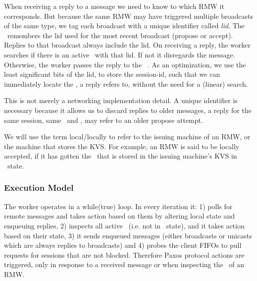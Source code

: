 \custvspace
{}
When receiving a reply to a message we need to know to which RMW it corresponds. But because the same RMW may have triggered multiple broadcasts of the same type, we tag each broadcast with a unique identifier called \emph{lid}. The \locentry~remembers the lid used for the most recent broadcast (propose or accept). 
Replies to that broadcast always include the lid. On receiving a reply, the worker searches if there is an active \locentry~with that lid. If not it disregards the message. Otherwise, the worker passes the reply to the \locentry~. As an optimization, we use the least significant bits of the lid, to store the session-id, such that we can immediately locate the  \locentry, a reply refers to, without the need for a (linear) search.

This is not merely a networking implementation detail. A unique identifier is necessary because it allows us to discard replies to older messages, \eg a reply for the same session, same \rmw~and \logno, may refer to an older propose attempt. 

\custvspace
{} We will use the term local/locally to refer to the issuing machine of an RMW, or the machine that stores the KVS. For example, an RMW is said to be locally accepted, if it has gotten the \kv~that is stored in the issuing machine's KVS in \acced\ state.

\subsubsection{Execution Model}

The worker operates in a while(true) loop. In every iteration it: 1) polls for remote messages and takes action based on them by altering local state and enqueuing replies, 2) inspects all active \locentries~(i.e. not in \invalid~state), and it takes action based on their state, 3) it sends enqueued messages (either broadcasts or unicasts which are always replies to broadcasts) and 4) probes the client FIFOs to pull requests for sessions that are not blocked.
Therefore Paxos protocol actions are triggered, only in response to a received message or when inspecting the \locentry~of an RMW.